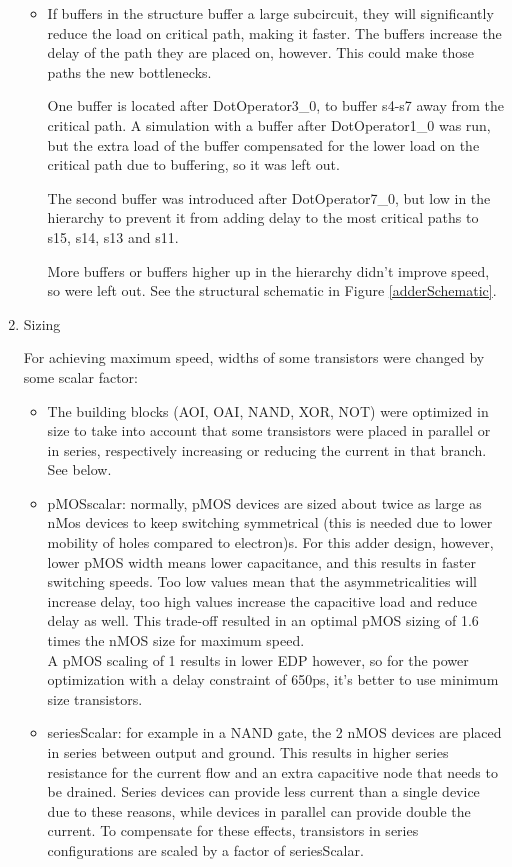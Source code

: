\documentclass[english]{article}
\begin{document}
\begin{enumerate}
\begin{itemize}
\item If buffers in the structure buffer a large subcircuit, they will significantly reduce the load on critical path, making it faster. The buffers increase the delay of the path they are placed on, however. This could make those paths the new bottlenecks. \par
One buffer is located after DotOperator3\_0, to buffer s4-s7 away from the critical path. A simulation with a buffer after DotOperator1\_0 was run, but the extra load of the buffer compensated for the lower load on the critical path due to buffering, so it was left out. \par
The second buffer was introduced after DotOperator7\_0, but low in the hierarchy to prevent it from adding delay to the most critical paths to s15, s14, s13 and s11. \par
More buffers or buffers higher up in the hierarchy didn't improve speed, so were left out. See the structural schematic in Figure \ref{adderSchematic}.
\end{itemize} %


\item Sizing \label{itm:sizing}

For achieving maximum speed, widths of some transistors were changed by some scalar factor:
\begin{itemize}
\item The building blocks (AOI, OAI, NAND, XOR, NOT) were optimized in size to take into account that some transistors were placed in parallel or in series, respectively increasing or reducing the current in that branch. See below.

\item pMOSscalar: normally, pMOS devices are sized about twice as large as nMos devices to keep switching symmetrical (this is needed due to lower mobility of holes compared to electron)s. For this adder design, however, lower pMOS width means lower capacitance, and this results in faster switching speeds. Too low values mean that the asymmetricalities will increase delay, too high values increase the capacitive load and reduce delay as well. This trade-off resulted in an optimal pMOS sizing of 1.6 times the nMOS size for maximum speed. \\
A pMOS scaling of 1 results in lower EDP however, so for the power optimization with a delay constraint of 650ps, it's better to use minimum size transistors.

\item seriesScalar: for example in a NAND gate, the 2 nMOS devices are placed in series between output and ground. This results in higher series resistance for the current flow and an extra capacitive node that needs to be drained. Series devices can provide less current than a single device due to these reasons, while devices in parallel can provide double the current. To compensate for these effects, transistors in series configurations are scaled by a factor of seriesScalar.


\end{itemize}
\end{enumerate}
\end{document}
